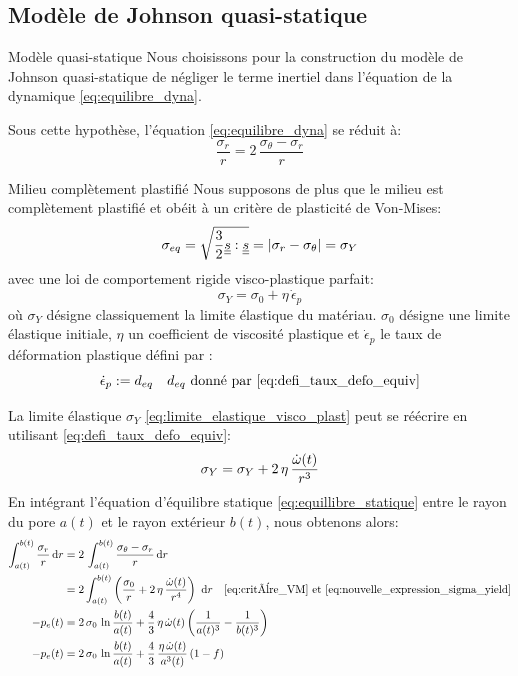 \documentclass[10pt]{book}
\newcommand{\Int}[2]{\int_{#1}^{#2}}
\begin{document}
\subsection{Modèle de Johnson quasi-statique}
\begin{Hypothese}{Modèle quasi-statique} Nous choisissons pour la construction du modèle de Johnson quasi-statique de négliger le terme inertiel dans l'équation de la dynamique \eqref{eq:equilibre_dyna}.
\end{Hypothese}
Sous cette hypothèse, l'équation \eqref{eq:equilibre_dyna} se réduit à:
\begin{equation}
\dfrac{\sigma_r}{r} = 2 \,\dfrac{\sigma_\theta-\sigma_r}{r}
\label{eq:equillibre_statique}
\end{equation}
\begin{Hypothese}{Milieu complètement plastifié} Nous supposons de plus que le milieu est complètement plastifié et obéit à un critère de plasticité de Von-Mises:
\begin{equation}
\sigma_{eq} = \sqrt{\dfrac{3}{2}\underline{\underline{s}}:\underline{\underline{s}}}=|\sigma_r-\sigma_\theta| = \sigma_Y
\label{eq:critère_VM}
\end{equation}
avec une loi de comportement rigide visco-plastique parfait:
\begin{equation}
\sigma_Y = \sigma_0 +\eta \,\dot{\epsilon}_p
\label{eq:limite_elastique_visco_plast}
\end{equation}
où $\sigma_{Y}$ désigne classiquement la limite élastique du matériau. $\sigma_{0}$ désigne une limite élastique initiale, $\eta$ un coefficient de viscosité plastique et $\dot{\epsilon}_p$ le taux de déformation plastique défini par : 
 $$\dot{\epsilon}_p:=d_{eq} \quad d_{eq} \text{ donné par \eqref{eq:defi_taux_defo_equiv}}$$
\end{Hypothese}
La limite élastique $\sigma_{Y}$ \eqref{eq:limite_elastique_visco_plast} peut se réécrire en utilisant \eqref{eq:defi_taux_defo_equiv}:
\begin{equation}
\sigma_Y = \sigma_{Y} + 2\,\eta\,\dfrac{\dot{\omega}(t)}{r^3}
\label{eq:nouvelle_expression_sigma_yield}
\end{equation}
En intégrant l'équation d'équilibre statique \eqref{eq:equillibre_statique} entre le rayon du pore $a(t)$ et le rayon extérieur $b(t)$, nous obtenons alors:
\begin{align}\nonumber
\Int{a(t)}{b(t)} \dfrac{\sigma_r}{r} \dr & = 2 \, \Int{a(t)}{b(t)}\dfrac{\sigma_\theta-\sigma_r}{r} \dr\\ &= 2\Int{a(t)}{b(t)}\pa{\dfrac{\sigma_0}{r}+   2\, \eta \,\dfrac{\dot{\omega}(t)}{r^4} }\, \dr \quad \eqref{eq:critère_VM} \et \eqref{eq:nouvelle_expression_sigma_yield}\\\nonumber
-p_e(t) & = 2 \,\sigma_0 \,\ln{\dfrac{b(t)}{a(t)}} +\dfrac{4}{3}\,\eta\,\dot{\omega}(t)\pa{\dfrac{1}{a(t)^3}-\dfrac{1}{b(t)^3}}\\\label{eq:porosite_avant_simpli}
-p_e(t) & = 2 \,\sigma_0 \,\ln{\dfrac{b(t)}{a(t)}} +\dfrac{4}{3}\,\dfrac{\eta\,\dot{\omega}(t)}{a^{3}(t)}\pa{1-f}
\end{align}
\end{document}
